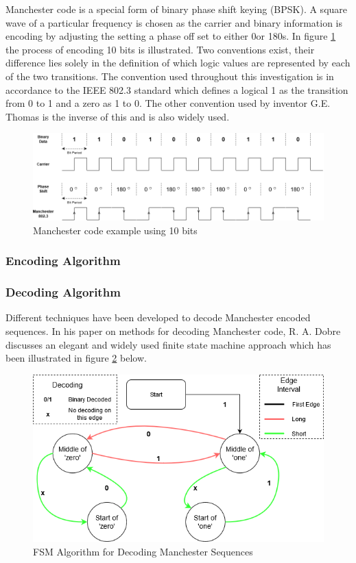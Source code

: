 Manchester code is a special form of binary phase shift keying (BPSK). A square wave of a particular frequency is chosen as the carrier and binary information is encoding by adjusting the setting a phase off set to either 0\degree or 180\degree s. In figure \ref{fig:manchesterencoding} the process of encoding 10 bits is illustrated. Two conventions exist, their difference lies solely in the definition of which logic values are represented by each of the two transitions. The convention used throughout this investigation is in accordance to the IEEE 802.3 standard which defines a logical 1 as the transition from 0 to 1 and a zero as 1 to 0. The other convention used by inventor G.E. Thomas is the inverse of this and is also widely used.\\

\begin{figure}[H]
	\centering
	\includegraphics[width=0.7\linewidth]{figures/litreview/manchester_encoding}
	\caption{Manchester code example using 10 bits}
	\label{fig:manchesterencoding}
\end{figure}

\subsubsection{Encoding Algorithm}



\subsubsection{Decoding Algorithm}
Different techniques have been developed to decode Manchester encoded sequences. In his paper on methods for decoding Manchester code, R. A. Dobre discusses an elegant and widely used finite state machine approach which has been illustrated in figure \ref{fig:manchesterdecodingfsm} below. \cite{Dobre2014}

\begin{figure}[H]
	\centering
	\includegraphics[width=0.7\linewidth]{figures/litreview/manchester_decoding_fsm.png}
	\caption{FSM Algorithm for Decoding Manchester Sequences}
	\label{fig:manchesterdecodingfsm}
\end{figure}

